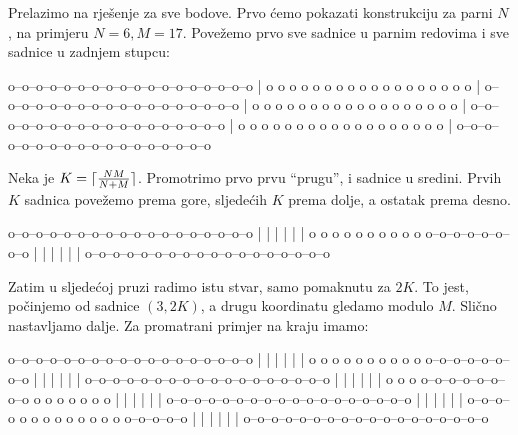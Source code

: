 Prelazimo na rješenje za sve bodove.
Prvo ćemo pokazati konstrukciju za parni $N$, na primjeru $N = 6, M = 17$.
Povežemo prvo sve sadnice u parnim redovima i sve sadnice u zadnjem stupcu:
\begin{verbbox}
o--o--o--o--o--o--o--o--o--o--o--o--o--o--o--o--o--o
                                                   |
o  o  o  o  o  o  o  o  o  o  o  o  o  o  o  o  o  o
                                                   |
o--o--o--o--o--o--o--o--o--o--o--o--o--o--o--o--o--o
                                                   |
o  o  o  o  o  o  o  o  o  o  o  o  o  o  o  o  o  o
                                                   |
o--o--o--o--o--o--o--o--o--o--o--o--o--o--o--o--o--o
                                                   |
o  o  o  o  o  o  o  o  o  o  o  o  o  o  o  o  o  o
                                                   |
o--o--o--o--o--o--o--o--o--o--o--o--o--o--o--o--o--o
\end{verbbox}
\begin{figure}[H]
  \centering
  \theverbbox
\end{figure}

Neka je $K = \lceil\frac{NM}{N + M}\rceil$. Promotrimo prvo
prvu ``prugu'', i sadnice u sredini. Prvih $K$ sadnica povežemo prema gore,
sljedećih $K$ prema dolje, a ostatak prema desno.

\begin{verbbox}
o--o--o--o--o--o--o--o--o--o--o--o--o--o--o--o--o--o
|  |  |  |  |                                      |
o  o  o  o  o  o  o  o  o  o  o--o--o--o--o--o--o--o
               |  |  |  |  |                       |
o--o--o--o--o--o--o--o--o--o--o--o--o--o--o--o--o--o
\end{verbbox}
\begin{figure}[H]
  \centering
  \theverbbox
\end{figure}

Zatim u sljedećoj pruzi radimo istu stvar, samo pomaknutu za $2K$. To jest,
počinjemo od sadnice $(3, 2K)$, a drugu koordinatu gledamo modulo $M$. Slično
nastavljamo dalje. Za promatrani primjer na kraju imamo:

\begin{verbbox}
o--o--o--o--o--o--o--o--o--o--o--o--o--o--o--o--o--o
|  |  |  |  |                                      |
o  o  o  o  o  o  o  o  o  o  o--o--o--o--o--o--o--o
               |  |  |  |  |                       |
o--o--o--o--o--o--o--o--o--o--o--o--o--o--o--o--o--o
                              |  |  |  |  |        |
o  o  o  o--o--o--o--o--o--o--o  o  o  o  o  o  o  o
|  |  |                                      |  |  |
o--o--o--o--o--o--o--o--o--o--o--o--o--o--o--o--o--o
         |  |  |  |  |                             |
o--o--o--o  o  o  o  o  o  o  o  o  o  o--o--o--o--o
                        |  |  |  |  |              |
o--o--o--o--o--o--o--o--o--o--o--o--o--o--o--o--o--o
\end{verbbox}
\begin{figure}[H]
  \centering
  \theverbbox
\end{figure}

